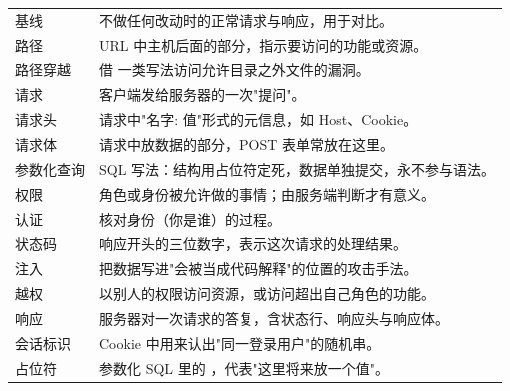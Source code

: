 \documentclass[UTF8,12pt,oneside]{ctexbook}
\begin{document}
\begin{longtable}{p{}p{}}
基线 & 不做任何改动时的正常请求与响应，用于对比。 \\
路径 & URL 中主机后面的部分，指示要访问的功能或资源。 \\
路径穿越 & 借 \code{../} 一类写法访问允许目录之外文件的漏洞。 \\
请求 & 客户端发给服务器的一次"提问"。 \\
请求头 & 请求中"名字: 值"形式的元信息，如 Host、Cookie。 \\
请求体 & 请求中放数据的部分，POST 表单常放在这里。 \\
参数化查询 & SQL 写法：结构用占位符定死，数据单独提交，永不参与语法。 \\
权限 & 角色或身份被允许做的事情；由服务端判断才有意义。 \\
认证 & 核对身份（你是谁）的过程。 \\
状态码 & 响应开头的三位数字，表示这次请求的处理结果。 \\
注入 & 把数据写进"会被当成代码解释"的位置的攻击手法。 \\
越权 & 以别人的权限访问资源，或访问超出自己角色的功能。 \\
响应 & 服务器对一次请求的答复，含状态行、响应头与响应体。 \\
会话标识 & Cookie 中用来认出"同一登录用户"的随机串。 \\
占位符 & 参数化 SQL 里的 \code{?}，代表"这里将来放一个值"。 \\
\bottomrule
\end{longtable}
\end{document}
